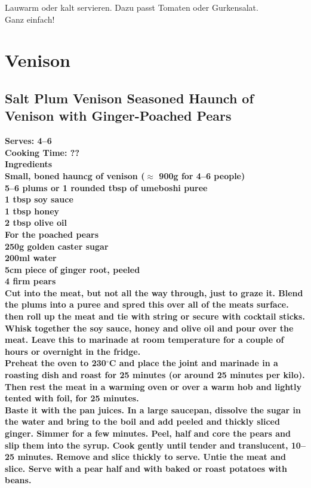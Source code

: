 \documentclass[18pt, oneside]{book}
\begin{document}
Lauwarm oder kalt servieren. Dazu passt Tomaten oder Gurkensalat. \\

Ganz einfach!


\chapter{Venison}

\section{Salt Plum Venison Seasoned Haunch of Venison with Ginger-Poached Pears}
\bf{Serves: 4--6} \\
\bf{Cooking Time: ??} \\

\bf{Ingredients} \normalfont \\
Small, boned hauncg of venison ($\approx$ 900g for 4--6 people)\\
5--6 plums or 1 rounded tbsp of umeboshi puree \\
1 tbsp soy sauce \\
1 tbsp honey \\
2 tbsp olive oil \\

\textbf{For the poached pears} \\
250g golden caster sugar \\
200ml water \\
5cm piece of ginger root, peeled \\
4 firm pears \\


Cut into the meat, but not all the way through, just to graze it. Blend the plums into a puree and spred this over all of the meats surface. then roll up the meat and tie with string or secure with cocktail sticks. Whisk together the soy sauce, honey and olive oil and pour over the meat. Leave this to marinade at room temperature for a couple of hours or overnight in the fridge. \\

Preheat the oven to 230$^{\circ}$C and place the joint and marinade in a roasting dish and roast for 25 minutes (or around 25 minutes per kilo). Then rest the meat in a warming oven or over a warm hob and lightly tented with foil, for 25 minutes. \\

Baste it with the pan juices. In a large saucepan, dissolve the sugar in the water and bring to the boil and add peeled and thickly sliced ginger. Simmer for a few minutes. Peel, half and core the pears and slip them into the syrup. Cook gently until tender and translucent, 10--25 minutes. Remove and slice thickly to serve. Untie the meat and slice. Serve with a pear half and with baked or roast potatoes with beans. 
\end{document}
